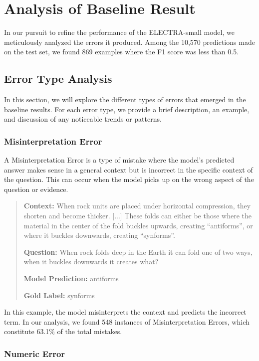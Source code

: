 \documentclass{article}
\begin{document}
\section{Analysis of Baseline Result}

In our pursuit to refine the performance of the ELECTRA-small model,
we meticulously analyzed the errors it produced. Among the 10,570 predictions
made on the test set, we found 869 examples where the F1 score was less than 0.5.

\subsection{Error Type Analysis}

In this section, we will explore the different types of errors that emerged
in the baseline results. For each error type, we provide a brief description,
an example, and discussion of any noticeable trends or patterns.
\subsubsection*{Misinterpretation Error}

A Misinterpretation Error is a type of mistake where the model's predicted
answer makes sense in a general context but is incorrect in the specific
context of the question. This can occur when the model picks up on the wrong
aspect of the question or evidence.

\begin{quote}
\textbf{Context:} When rock units are placed under horizontal compression,
they shorten and become thicker. [...] These folds can either be those where
the material in the center of the fold buckles upwards, creating ``antiforms'',
or where it buckles downwards, creating ``synforms''.

\textbf{Question:} When rock folds deep in the Earth it can fold one of two
ways, when it buckles downwards it creates what?

\textbf{Model Prediction:} antiforms

\textbf{Gold Label:} synforms
\end{quote}

In this example, the model misinterprets the context and predicts the incorrect
term. In our analysis, we found 548 instances of Misinterpretation Errors,
which constitute 63.1\% of the total mistakes.

\subsubsection*{Numeric Error}
\end{document}
